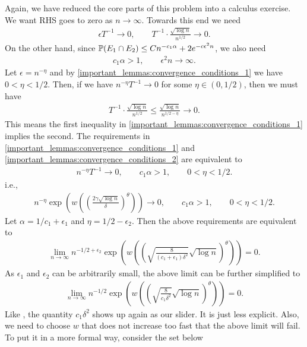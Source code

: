 \documentclass[10pt]{article}
\begin{document}
Again, we have reduced the core parts of this problem into a calculus exercise. We want RHS goes to zero as $n \to \infty$. Towards this end we need
\begin{align} \label{important_lemmas:convergence_conditions_1}
  \epsilon T^{-1} \to 0, \qquad  T^{-1} \cdot \frac{\sqrt{\log n}}{n^{1/2}} \to 0.
\end{align}
On the other hand, since $\mathbb{P}(E_1 \cap E_2) \leq Cn^{-c_1 \alpha} + 2e^{-c\epsilon^2n}$, we also need
\begin{align}  \label{important_lemmas:convergence_conditions_2}
  c_1 \alpha > 1, \qquad \epsilon^2 n \to \infty.
\end{align}
Let $\epsilon = n^{-\eta}$ and by \eqref{important_lemmas:convergence_conditions_1} we have $0< \eta < 1/2$. Then, if we have $ n^{-\eta} T^{-1} \to 0$ for some $\eta \in (0,1/2)$, then we must have
\begin{align}
  T^{-1} \cdot \frac{\sqrt{\log n}}{n^{1/2}} \leq \frac{\sqrt{\log n}}{n^{1/2 -\eta}} \to 0.
\end{align}
This means the first inequality in \eqref{important_lemmas:convergence_conditions_1} implies the second. The requirements in \eqref{important_lemmas:convergence_conditions_1} and \eqref{important_lemmas:convergence_conditions_2} are equivalent to
\begin{align}
  n^{-\eta} T^{-1} \to 0,\qquad  c_1 \alpha > 1, \qquad 0< \eta < 1/2.
\end{align}
i.e.,
\begin{align}
  n^{-\eta} \exp \left(w\left(\left(\frac{2\gamma \sqrt{\log n}}{\delta} \right)^{\theta} \right) \right) \to 0,\qquad  c_1 \alpha > 1, \qquad 0< \eta < 1/2.
\end{align}
Let $\alpha = 1/c_1 + \epsilon_1$ and $\eta = 1/2 - \epsilon_2$. Then the above requirements are equivalent to
\begin{align}
  \lim_{n \to \infty} n^{-1/2+\epsilon_2} \exp \left(w\left(\left(\sqrt{\frac{8}{(c_1+\epsilon_1)\delta^2}}\sqrt{\log n} \right)^{\theta} \right) \right) = 0.
\end{align}
As $\epsilon_1$ and $\epsilon_2$ can be arbitrarily small, the above limit can be further simplified to
\begin{align} \label{important_lemmas:convergence_conditions_3}
  \lim_{n \to \infty} n^{-1/2} \exp \left(w\left(\left(\sqrt{\frac{8}{c_1\delta^2}}\sqrt{\log n} \right)^{\theta} \right) \right) = 0.
\end{align}
Like \cite{auffinger-tsne}, the quantity $c_1\delta^2$ shows up again as our slider. It is just less explicit. Also, we need to choose $w$ that does not increase too fast that the above limit will fail. To put it in a more formal way, consider the set below
\end{document}
